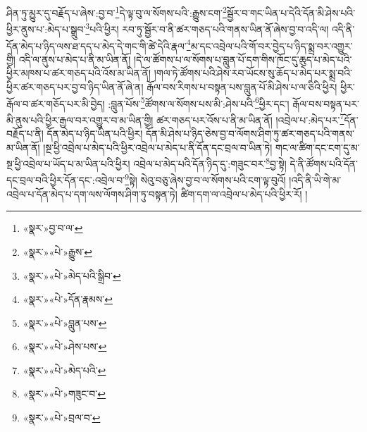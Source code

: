 ཤིན་ཏུ་མྱུར་དུ་བརྗོད་པ་ཞེས་:བྱ་བ་\footnote{«སྣར་»བྱ་བ་ལ་}དེ་ལྟ་བུ་ལ་སོགས་པའི་:རྒྱུས་ངག་\footnote{«སྣར་»«པེ་»རྒྱུས་}སྦྱོར་བ་གང་ཡིན་པ་དེའི་དོན་མི་ཤེས་པའི་ཕྱིར་ནུས་པ་:མེད་པ་སྒྲུབ་\footnote{«སྣར་»«པེ་»མེད་པའི་སྒྲིབ་}པའི་ཕྱིར། རབ་ཏུ་སྦྱོར་བ་ནི་ཚར་གཅད་པའི་གནས་ཡིན་ནོ་ཞེས་བྱ་བ་འདི་ལ། འདི་ནི་དོན་མེད་པ་ཉིད་ལས་ཐ་དད་པ་མེད་དེ་གང་གི་ཚེ་དེའི་རྣལ་\footnote{«སྣར་»«པེ་»དོན་རྣམས་}མ་དང་འབྲེལ་པའི་གོ་བར་བྱེད་པ་ཉིད་སྨྲ་བར་འགྱུར་གྱི། འདི་ལ་ནུས་པ་མེད་པ་ནི་མ་ཡིན་ནོ། །དེ་ལ་ཚོགས་པ་ལ་སོགས་པ་བླུན་པོ་དག་གིས་ཁོང་དུ་ཆུད་པ་མེད་པའི་ཕྱིར་མཁས་པ་ཚར་གཅད་པའི་འོས་མ་ཡིན་ནོ། །གལ་ཏེ་ཚོགས་པའི་ཤེས་རབ་ཡོངས་སུ་ཆོད་པ་མེད་པར་སྨྲ་བའི་ཕྱིར་ཚར་གཅད་པར་བྱ་བ་ཉིད་ཡིན་ནོ་ཞེ་ན། རྒོལ་བས་རིགས་པ་བསྟན་པས་བླུན་པོ་མི་ཤེས་པ་ལ་ཅིའི་ཕྱིར། ཕྱིར་རྒོལ་བ་ཚར་གཅོད་པར་མི་བྱེད། :བླུན་པོས་\footnote{«སྣར་»«པེ་»བླུན་པས་}ཚོགས་ལ་སོགས་པས་མི་:ཤེས་པའི་\footnote{«སྣར་»«པེ་»ཤེས་པས་}ཕྱིར་དང་། རྒོལ་བས་བསྟན་པར་མི་ནུས་པའི་ཕྱིར་རྒྱལ་བར་འགྱུར་བ་མ་ཡིན་གྱི། ཚར་གཅད་པར་འོས་པ་ནི་མ་ཡིན་ནོ། །འབྲེལ་པ་:མེད་པར་\footnote{«སྣར་»«པེ་»མེད་པའི་}དོན་བརྗོད་པ་ནི། དོན་མེད་པ་ཉིད་ཡིན་པའི་ཕྱིར། དོན་མི་ཤེས་པ་ཉིད་ཅེས་བྱ་བ་ལོགས་ཤིག་ཏུ་ཚར་གཅད་པའི་གནས་མ་ཡིན་ནོ། །སྔ་ཕྱི་འབྲེལ་པ་མེད་པའི་ཕྱིར་འབྲེལ་པ་མེད་པ་ནི་དོན་དང་བྲལ་བ་ཡིན་ཏེ། གང་ལ་ཚིག་དང་ངག་དུ་མ་སྔ་ཕྱི་འབྲེལ་པ་ཡོད་པ་མ་ཡིན་པའི་ཕྱིར། འབྲེལ་པ་མེད་པའི་དོན་ཉིད་དུ་:གཟུང་བར་\footnote{«སྣར་»«པེ་»གཟུང་བ་}བྱ་སྟེ། དེ་ནི་ཚོགས་པའི་དོན་དང་བྲལ་བའི་ཕྱིར་དོན་དང་:འབྲེལ་བ་\footnote{«སྣར་»«པེ་»བྲལ་བ་}སྟེ། སེའུ་བཅུ་ཞེས་བྱ་བ་ལ་སོགས་པའི་ངག་ལྟ་བུའོ། །འདི་ནི་ཡི་གེ་མ་འབྲེལ་པ་དོན་མེད་པ་དག་ལས་ལོགས་ཤིག་ཏུ་བསྟན་ཏེ། ཚིག་དག་ལ་འབྲེལ་པ་མེད་པའི་ཕྱིར་རོ། །
